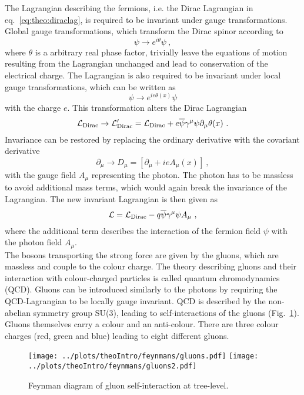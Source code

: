 \noindent The Lagrangian describing the fermions, i.e. the Dirac Lagrangian in eq.~\ref{eq:theo:diraclag}, is required to be invariant under gauge transformations. Global gauge transformations, which transform the Dirac spinor according to
\begin{equation}
\psi\rightarrow e^{i\theta}\psi ~,
\end{equation}
where $\theta$ is a arbitrary real phase factor, trivially leave the equations of motion resulting from the Lagrangian unchanged and lead to conservation of the electrical charge. The Lagrangian is also required to be invariant under local gauge transformations, which can be written as
\begin{equation}
\psi\rightarrow e^{ie\theta(x)}\psi
\end{equation} 
with the charge $e$. This transformation alters the Dirac Lagrangian
\begin{equation}
\mathcal{L}_{\rm Dirac} \rightarrow \mathcal{L}_{\rm Dirac}' = \mathcal{L}_{\rm Dirac} + e\overline{\psi}\gamma^\mu\psi\partial_\mu \theta(x) ~.
\end{equation}
Invariance can be restored by replacing the ordinary derivative with the covariant derivative
\begin{equation}
\partial_\mu \rightarrow D_\mu = [\partial_\mu + ieA_\mu(x)] ~,
\end{equation}
with the gauge field $A_\mu$ representing the photon. The photon has to be massless to avoid additional mass terms, which would again break the invariance of the Lagrangian. The new invariant Lagrangian is then given as
\begin{equation}
\mathcal{L} = \mathcal{L}_{\rm Dirac} - q\overline{\psi}\gamma^\mu\psi A_\mu ~,
\end{equation}
where the additional term describes the interaction of the fermion field $\psi$ with the photon field $A_\mu$.\\

\noindent The bosons transporting the strong force are given by the gluons, which are massless and couple to the colour charge. The theory describing gluons and their interaction with colour-charged particles is called quantum chromodynamics (QCD). Gluons can be introduced similarly to the photons by requiring the QCD-Lagrangian to be locally gauge invariant. QCD is described by the non-abelian symmetry group SU(3), leading to self-interactions of the gluons (Fig.~\ref{fig:theo:gluoncoupling}). Gluons themselves carry a colour and an anti-colour. There are three colour charges (red, green and blue) leading to eight different gluons.\\
\begin{figure}
	\centering
	\texttt{[image: ../plots/theoIntro/feynmans/gluons.pdf]}
	\texttt{[image: ../plots/theoIntro/feynmans/gluons2.pdf]}
	\caption[Feynman diagram of gluon self-interaction at tree-level]{Feynman diagram of gluon self-interaction at tree-level.}
	\label{fig:theo:gluoncoupling}
\end{figure}

